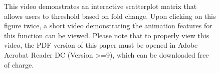 \documentclass[11pt,a4paper,oldfontcommands,openany]{memoir}
\numberwithin{equation}{section} %
\begin{document}
\begin{figure}[H]
    \begin{framed}
    \centering
    \end{framed}
    \caption{This video demonstrates an interactive scatterplot matrix that allows users to threshold based on fold change. Upon clicking on this figure twice, a short video demonstrating the animation features for this function can be viewed. Please note that to properly view this video, the PDF version of this paper must be opened in Adobe Acrobat Reader DC (Version >=9), which can be downloaded free of charge.}
    \label{fig:scatMatFC}
\end{figure}
\end{document}
